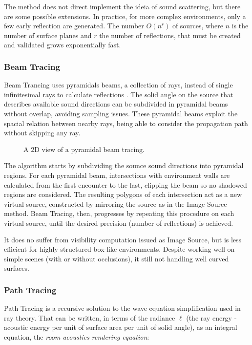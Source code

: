 The method does not direct implement the ideia of sound scattering, but there
are some possible extensions\cite{chandak2011fast}. In practice, for more
complex environments, only a few early reflection are generated. The number
$O(n^r)$ of sources, where $n$ is the number of surface planes and $r$ the
number of reflections, that must be created and validated grows exponentially
fast.

\subsubsection{Beam Tracing}

Beam Trancing uses pyramidals beams, a collection of rays, instead of single
infinitesimal rays to calculate reflections \cite{funkhouser2003survey}. The
solid angle on the source that describes available sound directions can be
subdivided in pyramidal beams without overlap, avoiding sampling issues. These
pyramidal beams exploit the spacial relation between nearby rays, being able to
consider the propagation path without skipping any ray.

\begin{figure}[h]
	\centering
	
	\caption{A 2D view of a pyramidal beam tracing.}
	\label{fig:beamtrace}
\end{figure}

The algorithm starts by subdividing the sounce sound directions into pyramidal
regions. For each pyramidal beam, intersections with environment walls are
calculated from the first encounter to the last, clipping the beam so no
shadowed regions are considered. The resulting polygons of each intersection act
as a new virtual source, constructed by mirroring the source as in the Image
Source method. Beam Tracing, then, progresses by repeating this procedure on
each virtual source, until the desired precision (number of reflections) is
achieved.

It does no suffer from visibility computation issued as Image Source, but is
less efficient for highly structured box-like environments. Despite working well
on simple scenes (with or without occlusions), it still not handling well
curved surfaces.


\subsubsection{Path Tracing}

Path Tracing is a recursive solution to the wave equation simplification used in
ray theory. That can be written, in terms of the radiance $\ell$ (the ray
energy - acoustic energy per unit of surface area per unit of solid angle), as an
integral equation, the \textit{room acoustics rendering
equation}\cite{siltanen2007room}:

